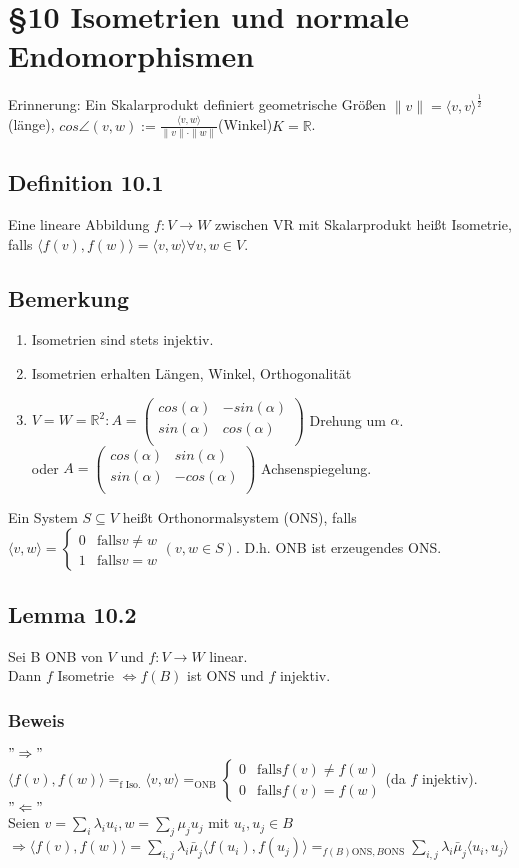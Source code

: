 \documentclass[a4paper, 12pt]{extarticle}
\newcommand{\twopartdef}[4] {
	\left\{
		\begin{array}{ll}
			#1 & #2 \\
			#3 & #4
		\end{array}
	\right.
}
\newcommand{\norm}[1]{
	\parallel #1 \parallel
}
\newcommand{\skalar}[2] {
	\langle #1, #2\rangle
}
\begin{document}
\section*{§10 Isometrien und normale Endomorphismen}
Erinnerung: Ein Skalarprodukt definiert geometrische Größen
$\norm{v} = \skalar{v}{v}^{\frac{1}{2}}$(länge), $cos\angle(v,w) := \frac{\skalar{v}{w}}{\norm{v}\cdot \norm{w}}$(Winkel)$K = \mathbb{R}$.
\subsection*{Definition 10.1}
Eine lineare Abbildung $f: V \longrightarrow W$ zwischen VR mit Skalarprodukt heißt Isometrie, falls $\skalar{f(v)}{f(w)} = \skalar{v}{w} \forall v,w \in V$.\\
\subsection*{Bemerkung}
\begin{enumerate}[label = \alph*)]
	\item Isometrien sind stets injektiv.
	\item Isometrien erhalten Längen, Winkel, Orthogonalität
	\item $V = W = \mathbb{R}^2: A = \left( \begin{matrix}
		cos(\alpha) & -sin(\alpha) \\
		sin(\alpha) & cos(\alpha) \\
	\end{matrix}\right)$ Drehung um $\alpha$.\\
	oder $A = \left( \begin{matrix}
		cos(\alpha) & sin(\alpha) \\
		sin(\alpha) & -cos(\alpha) \\
	\end{matrix}\right)$ Achsenspiegelung.
\end{enumerate}
Ein System $S\subseteq V$ heißt Orthonormalsystem (ONS), falls $\skalar{v}{w} = \twopartdef{0}{\text{falls} v \neq w}{1}{\text{falls} v = w} (v,w\in S).$ D.h. ONB ist erzeugendes ONS.
\subsection*{Lemma 10.2}
Sei B ONB von $V$ und $f: V \longrightarrow W$ linear.\\
Dann $f$ Isometrie $\Leftrightarrow f(B)$ ist ONS und $f$ injektiv.
\subsubsection*{Beweis}
$"\Rightarrow"$\\
$\skalar{f(v)}{f(w)} =_{\text{f Iso.}} \skalar{v}{w} =_{\text{ONB}}  \twopartdef{0}{\text{falls} f(v) \neq f(w)}{0}{\text{falls} f(v) = f(w)}$(da $f$ injektiv).\\
$"\Leftarrow"$\\
Seien $v = \sum_{i}\lambda_i u_i, w= \sum_{j} \mu_j u_j$ mit $u_i, u_j \in B$\\
$\Rightarrow \skalar{f(v)}{f(w)} = \sum_{i, j} \lambda_i\bar\mu_j \skalar{f(u_i)}{f(u_j)} =_{f(B)\text{ONS}, B \text{ONS}} \sum_{i,j}\lambda_i\bar\mu_j \skalar{u_i}{u_j}$
\end{document}
